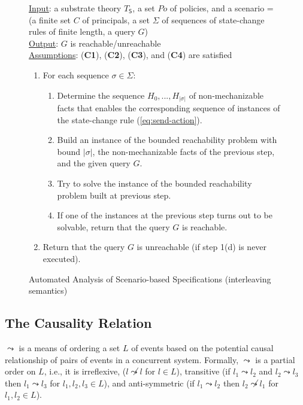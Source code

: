 \documentclass[conference]{llncs}
\begin{document}
{\begin{figure}[t]
\centering
\begin{minipage}{.9\textwidth}
\underline{\textsf{Input}}: a substrate theory $T_{\mathsf{S}}$, a set
$\mathit{Po}$ of policies, and a scenario = (a finite set $C$ of
principals, a set $\Sigma$ of sequences of state-change rules of
finite length, a query $G$)\\
\underline{\textsf{Output}}: $G$ is reachable/unreachable\\
\underline{\textsf{Assumptions}}:  (\textbf{C1}), (\textbf{C2}),
(\textbf{C3}), and  (\textbf{C4}) are satisfied
\begin{enumerate}
\item For each sequence $\sigma\in \Sigma$:
\begin{enumerate}
  \item Determine the sequence $H_0, ..., H_{|\sigma|}$ of
    non-mechanizable facts that enables the corresponding sequence of
    instances of the state-change rule (\ref{eq:send-action}).
  \item Build an instance of the bounded reachability problem with
    bound $|\sigma|$, the non-mechanizable facts of the previous
    step, and the given query $G$.
  \item Try to solve the instance of the bounded reachability problem
    built at previous step.
\item If one of the instances at the previous step turns out to be
    solvable, return that the query $G$ is reachable.
\end{enumerate}
\item Return that the query $G$ is unreachable (if step 1(d) is never executed).
\end{enumerate}
\end{minipage}
\caption{\label{fig:automated-analysis}Automated Analysis of Scenario-based Specifications (interleaving semantics)}
\end{figure}


\subsection{The Causality Relation} 
$\leadsto$ is a means of ordering a set
$L$ of events based on the potential causal relationship of pairs of
events in a concurrent system. Formally, $\leadsto$ is a partial order
on $L$, i.e., it is irreflexive, ($l\not\leadsto l$ for $l\in L$),
transitive  
(if $l_1\leadsto l_2$ and $l_2\leadsto l_3$ then $l_1\leadsto
l_3$ for $l_1, l_2, l_3\in L$), and 
anti-symmetric (if $l_1\leadsto l_2$ then $l_2\not \leadsto l_1$ for $l_1, l_2\in L$). 

}
\end{document}
